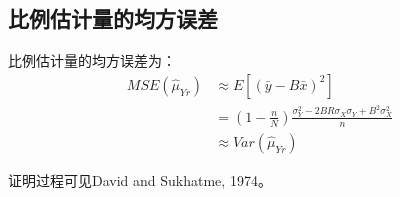 \subsection{比例估计量的均方误差}
\begin{theorem}
	比例估计量的均方误差为：
	\begin{align*}
		MSE(\hat{\mu}_{Yr})&\approx E\left[(\bar{y}-B\bar{x})^2\right] \\
		&=\left(1-\frac{n}{N}\right)\frac{\sigma_Y^2-2BR\sigma_X\sigma_Y+B^2\sigma_X^2}{n} \\
		&\approx Var(\hat{\mu}_{Yr})
	\end{align*}
\end{theorem}
证明过程可见David and Sukhatme, 1974。

